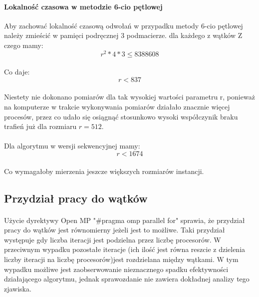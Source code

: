 \documentclass{scrartcl}
\begin{document}
\paragraph{Lokalność czasowa w metodzie 6-cio pętlowej} Aby zachować lokalność czasową odwołań w przypadku metody 6-cio pętlowej należy zmieścić w pamięci podręcznej 3 podmacierze. dla każdego z wątków Z czego mamy:
\begin{equation}
r^2 * 4 * 3 \leq 8388608
\end{equation}
\paragraph{}Co daje:
\begin{equation}
r < 837
\end{equation}
\paragraph{}Niestety nie dokonano pomiarów dla tak wysokiej wartości parametru r, ponieważ na komputerze w trakcie wykonywania pomiarów działało znacznie więcej procesów, przez co udało się osiągnąć stosunkowo wysoki współczynik braku trafień już dla rozmiaru $r = 512$.
\paragraph{}Dla algorytmu w wersji sekwencyjnej mamy:
\begin{equation}
r < 1674
\end{equation}
\paragraph{}Co wymagałoby mierzenia jeszcze większych rozmiarów instancji.
\subsection{Przydział pracy do wątków}
\paragraph{}Użycie dyrektywy Open MP "\#pragma omp parallel for" sprawia, że przydział pracy do wątków jest równomierny jeżeli jest to możliwe. Taki przydział występuje gdy liczba iteracji jest podzielna przez liczbę procesorów. W przeciwnym wypadku pozostałe iteracje (ich ilość jest równa reszcie z dzielenia liczby iteracji na liczbę procesorów)jest rozdzielana między wątkami. W tym wypadku możliwe jest zaobserwowanie nieznacznego spadku efektywności działającego algorytmu, jednak sprawozdanie nie zawiera dokładnej analizy tego zjawiska.
\end{document}
